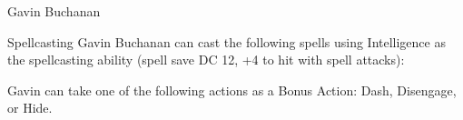 \begin{DndMonster}[width=0.5\textwidth]{Gavin Buchanan}
	\DndMonsterAttack[
		name			= Shortbow,
		distance		= ranged,	%
		mod				= +6,
		range			= 80/320,
		targets			= one target,
		dmg				= \DndDice{1d6 + 4},
		dmg-type		= Piercing,
	]
	
	\begin{DndMonsterSpells}
		\item[Spellcasting] Gavin Buchanan can cast the following spells using Intelligence as the spellcasting ability (spell save DC 12, +4 to hit with spell attacks):
	\end{DndMonsterSpells}
	
	Gavin can take one of the following actions as a Bonus Action: Dash, Disengage, or Hide.
\end{DndMonster}